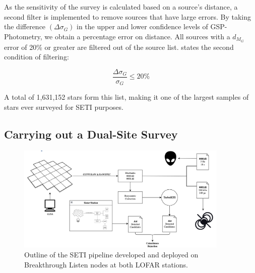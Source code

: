 As the sensitivity of the survey is calculated based on a source's distance, a second filter is implemented to remove sources that have large errors. By taking the difference $(\Delta \sigma_G)$ in the upper and lower confidence levels of GSP-Photometry, we obtain a percentage error on distance. All sources with a $d_{M_G}$ error of 20\% or greater are filtered out of the source list.  states the second condition of filtering:

\begin{equation}
    \frac{\Delta \sigma_G}{\sigma_G} \leq 20\%
    \label{Gaia:filter2}
\end{equation}

A total of 1,631,152 stars form this list, making it one of the largest samples of stars ever surveyed for SETI purposes.

\subsection{Carrying out a Dual-Site Survey}


\begin{figure}
    \centering
    \includegraphics[width = 0.9\textwidth]{figs/SETI-pipeline.png}
    \caption{Outline of the SETI pipeline developed and deployed on Breakthrough Listen nodes at both LOFAR stations.}
    \label{fig:SETI-pipeline}
\end{figure}

